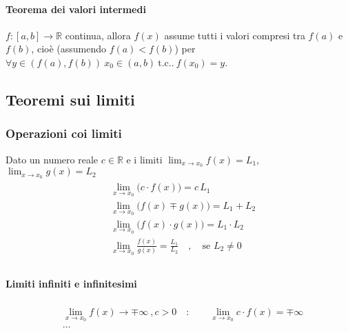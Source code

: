 \documentclass[letterpaper,10pt,english]{jupyterBook}
\begin{document}
\sphinxAtStartPar
{} 


\paragraph{Teorema dei valori intermedi}
\label{\detokenize{ch/infinitesimal_calculus/limits:teorema-dei-valori-intermedi}}
\sphinxAtStartPar
{} \(f: [a,b] \rightarrow \mathbb{R}\) continua, allora \(f(x)\) assume tutti i valori compresi tra \(f(a)\) e \(f(b)\), cioè (assumendo \(f(a) < f(b)\)) per \(\forall y \in (f(a), f(b)) \ x_0 \in (a,b) \ \text{t.c..} \ f(x_0) = y\).

\sphinxAtStartPar
{} 


\subsection{Teoremi sui limiti}
\label{\detokenize{ch/infinitesimal_calculus/limits:teoremi-sui-limiti}}

\subsubsection{Operazioni coi limiti}
\label{\detokenize{ch/infinitesimal_calculus/limits:operazioni-coi-limiti}}
\sphinxAtStartPar
Dato un numero reale \(c \in \mathbb{R}\) e i limiti \(\lim_{x \rightarrow x_0} f(x) = L_1\), \(\lim_{x \rightarrow x_0} g(x) = L_2\)
\begin{equation*}
\begin{split}\begin{aligned}
 & \lim_{x \rightarrow x_0} \big( c \cdot f(x) \big) = c \, L_1 \\
 & \lim_{x \rightarrow x_0} \big( f(x) \mp g(x) \big) = L_1 + L_2 \\
 & \lim_{x \rightarrow x_0} \big( f(x) \cdot g(x) \big) = L_1 \cdot L_2 \\
 & \lim_{x \rightarrow x_0} \frac{ f(x) }{ g(x) } = \frac{L_1}{L_2} \quad , \quad \text{se $L_2 \ne 0$}  \\
\end{aligned}\end{split}
\end{equation*}

\paragraph{Limiti infiniti e infinitesimi}
\label{\detokenize{ch/infinitesimal_calculus/limits:limiti-infiniti-e-infinitesimi}}\begin{equation*}
\begin{split}\begin{aligned}
 &  \lim_{x \rightarrow x_0}f(x) \rightarrow \mp \infty \ , c > 0 \quad : \qquad \lim_{x \rightarrow x_0} c \cdot f(x) = \mp \infty \\
 & \dots \\
\end{aligned}\end{split}
\end{equation*}
\end{document}
